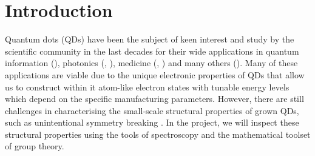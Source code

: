 \documentclass[12pt]{article}
\begin{document}






\begin{abstract}

In this project, we investigate the photonic properties of quantum dots employing an approach analogous to standard procedures in studies of the topic. Experimental data from polarisation resolved photoluminiscence spectroscopy are investigated using the theory of exciton complexes and group theory. The major features of the spectral diagrams can be labelled by exciton state transitions immediately by considering the properties of states of these exciton complexes. These major features also exhibit splitting caused by fine-structure spin interactions. This splitting is modelled using double groups, and agreement with polarisation and intensity of each resolvable peak is assessed. Predictions for dark and unresolved peaks are stated. Possible symmetry elevations in the quantum dot are discussed with consideration for their effects on the observed spectra.

\end{abstract}


\section{Introduction}
Quantum dots (QDs) have been the subject of keen interest and study by the scientific community in the last decades for their wide applications in quantum information (\cite{quantum_information1}), photonics (\cite{photonics1}, \cite{photonics2}), medicine (\cite{medicine1}, \cite{medicine2}) and many others (\cite{other_applications}). Many of these applications are viable due to the unique electronic properties of QDs that allow us to construct within it atom-like electron states \cite{atomlike} with tunable energy levels \cite{tunable} which depend on the specific manufacturing parameters. However, there are still challenges in characterising the small-scale structural properties of grown QDs, such as unintentional symmetry breaking \cite{karlsson}. In the project, we will inspect these structural properties using the tools of spectroscopy and the mathematical toolset of group theory.
\end{document}

